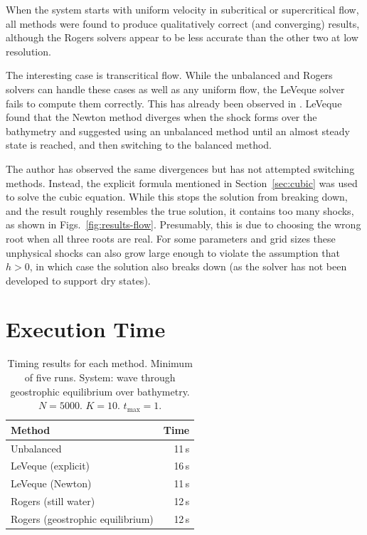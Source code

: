 When the system starts with uniform velocity in subcritical or supercritical flow, all methods were found to produce qualitatively correct (and converging) results, although the Rogers solvers appear to be less accurate than the other two at low resolution.

The interesting case is transcritical flow. While the unbalanced and Rogers solvers can handle these cases as well as any uniform flow, the LeVeque solver fails to compute them correctly. This has already been observed in \cite{leveque1998balancing}. LeVeque found that the Newton method diverges when the shock forms over the bathymetry and suggested using an unbalanced method until an almost steady state is reached, and then switching to the balanced method.

The author has observed the same divergences but has not attempted switching methods. Instead, the explicit formula mentioned in Section~\ref{sec:cubic} was used to solve the cubic equation. While this stops the solution from breaking down, and the result roughly resembles the true solution, it contains too many shocks, as shown in Figs.~\ref{fig:results-flow}. Presumably, this is due to choosing the wrong root when all three roots are real. For some parameters and grid sizes these unphysical shocks can also grow large enough to violate the assumption that $h > 0$, in which case the solution also breaks down (as the solver has not been developed to support dry states).

\section{Execution Time}

\begin{table}
  \centering
  \begin{tabular}{lr}
    Method & Time \\
    \hline
    Unbalanced & 11\,s \\
    LeVeque (explicit) & 16\,s\\
    LeVeque (Newton) & 11\,s\\
    Rogers (still water) & 12\,s\\
    Rogers (geostrophic equilibrium) & 12\,s
  \end{tabular}
  \caption{Timing results for each method. Minimum of five runs. System: wave through geostrophic equilibrium over bathymetry. $N = 5000$. $K = 10$. $t_{\mathrm{max}} = 1$.}
  \label{tab:timing}
\end{table}

